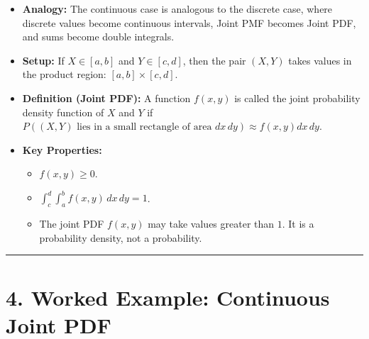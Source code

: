 \documentclass{article}
\begin{document}
\begin{itemize}[label=\textbullet]
    \item \textbf{Analogy:} The continuous case is analogous to the discrete case, where discrete values become continuous intervals, Joint PMF becomes Joint PDF, and sums become double integrals.
    \item \textbf{Setup:} If $X \in [a, b]$ and $Y \in [c, d]$, then the pair $(X, Y)$ takes values in the product region: $[a, b] \times [c, d]$.
    \item \textbf{Definition (Joint PDF):} A function $f(x, y)$ is called the joint probability density function of $X$ and $Y$ if $P((X, Y) \text{ lies in a small rectangle of area } dx \, dy) \approx f(x, y) dx \, dy$.
    \item \textbf{Key Properties:}
    \begin{itemize}[label=$\circ$]
        \item $f(x, y) \ge 0$.
        \item $\int_{c}^{d} \int_{a}^{b} f(x, y) \, dx \, dy = 1$.
        \item The joint PDF $f(x, y)$ may take values greater than $1$. It is a probability density, not a probability.
    \end{itemize}
\end{itemize}

\vspace{0.25cm}
\hrule
\vspace{0.25cm}

\section*{4. Worked Example: Continuous Joint PDF}
\end{document}

